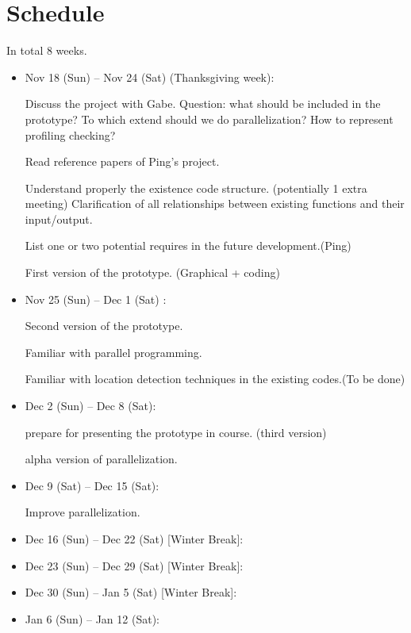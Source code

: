 \documentclass[a4paper,12pt]{article}
\numberwithin{equation}{section}
\begin{document}
	\newpage
	\section{Schedule}
	In total 8 weeks.
	
	\begin{itemize}
		\item Nov 18 (Sun) -- Nov 24 (Sat) (Thanksgiving week):  
		
		Discuss the project with Gabe. Question: what should be included in the prototype? To which extend should we do parallelization? How to represent profiling checking?  
		
		Read reference papers of Ping's project.
		
		Understand properly the existence code structure. (potentially 1 extra meeting) 
		Clarification of all relationships between existing functions and their input/output. 
		
		List one or two potential requires in the future development.(Ping)
		
		First version of the prototype. (Graphical + coding)
		
		
		\item Nov 25 (Sun) -- Dec 1 (Sat) : 
		  
		Second version of the prototype. 
		
		Familiar with parallel programming.
		
		Familiar with location detection techniques in the existing codes.(To be done) 
		
		\item Dec 2 (Sun) -- Dec 8 (Sat): 
		
		prepare for presenting the prototype in course. (third version)
		
		alpha version of parallelization.
		
		\item Dec 9 (Sat) -- Dec 15 (Sat):
		
		Improve parallelization. 
		
		\item Dec 16 (Sun) -- Dec 22 (Sat) [Winter Break]:
		\item Dec 23 (Sun) -- Dec 29 (Sat) [Winter Break]:
		\item Dec 30 (Sun) -- Jan 5  (Sat) [Winter Break]:
		\item Jan 6 (Sun) -- Jan 12 (Sat):
		
		
		
		 
		
	\end{itemize}
	


	
	{}
	
\end{document}
